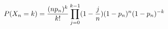 \documentclass[preview]{standalone}
\begin{document}
\begin{align*}
\special{dvisvgm:raw <g id='unique000'>}P(X_n=k)=\frac{(np_n)^k}{k!}\prod_{j=0}^{k-1}(1-\frac jn)(1-p_n)^n(1-p_n)^{-k}\special{dvisvgm:raw </g>}
\end{align*}
\end{document}

